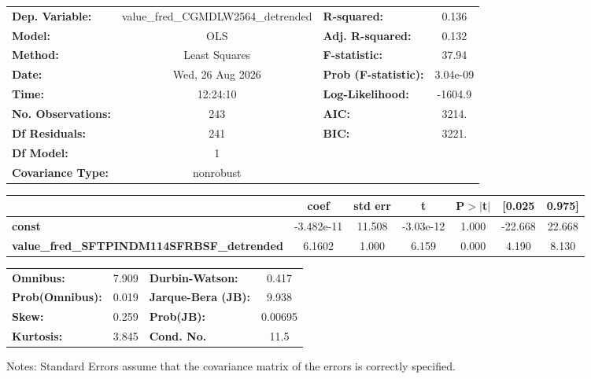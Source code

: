 \begin{center}
\begin{tabular}{lclc}
\toprule
\textbf{Dep. Variable:}                            & value\_fred\_CGMDLW2564\_detrended & \textbf{  R-squared:         } &     0.136   \\
\textbf{Model:}                                    &                OLS                 & \textbf{  Adj. R-squared:    } &     0.132   \\
\textbf{Method:}                                   &           Least Squares            & \textbf{  F-statistic:       } &     37.94   \\
\textbf{Date:}                                     &          Wed, 26 Aug 2026          & \textbf{  Prob (F-statistic):} &  3.04e-09   \\
\textbf{Time:}                                     &              12:24:10              & \textbf{  Log-Likelihood:    } &   -1604.9   \\
\textbf{No. Observations:}                         &                  243               & \textbf{  AIC:               } &     3214.   \\
\textbf{Df Residuals:}                             &                  241               & \textbf{  BIC:               } &     3221.   \\
\textbf{Df Model:}                                 &                    1               & \textbf{                     } &             \\
\textbf{Covariance Type:}                          &             nonrobust              & \textbf{                     } &             \\
\bottomrule
\end{tabular}
\begin{tabular}{lcccccc}
                                                   & \textbf{coef} & \textbf{std err} & \textbf{t} & \textbf{P$> |$t$|$} & \textbf{[0.025} & \textbf{0.975]}  \\
\midrule
\textbf{const}                                     &   -3.482e-11  &       11.508     & -3.03e-12  &         1.000        &      -22.668    &       22.668     \\
\textbf{value\_fred\_SFTPINDM114SFRBSF\_detrended} &       6.1602  &        1.000     &     6.159  &         0.000        &        4.190    &        8.130     \\
\bottomrule
\end{tabular}
\begin{tabular}{lclc}
\textbf{Omnibus:}       &  7.909 & \textbf{  Durbin-Watson:     } &    0.417  \\
\textbf{Prob(Omnibus):} &  0.019 & \textbf{  Jarque-Bera (JB):  } &    9.938  \\
\textbf{Skew:}          &  0.259 & \textbf{  Prob(JB):          } &  0.00695  \\
\textbf{Kurtosis:}      &  3.845 & \textbf{  Cond. No.          } &     11.5  \\
\bottomrule
\end{tabular}
\end{center}

Notes: \newline
 [1] Standard Errors assume that the covariance matrix of the errors is correctly specified.